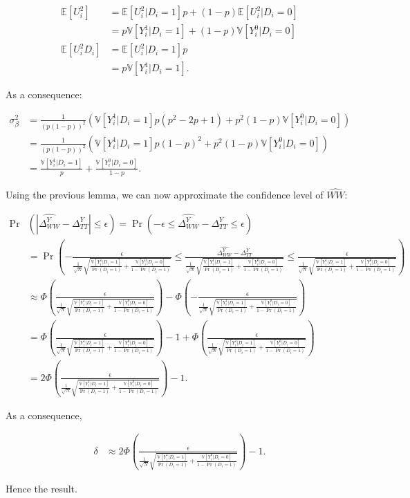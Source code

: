 \documentclass[]{book}
\newcommand{\esp}[1]{\mathbb{E}[ #1 ]}
\newcommand{\var}[1]{\mathbb{V}[ #1 ]}
\theoremstyle{definition}
\theoremstyle{definition}
\theoremstyle{definition}
\theoremstyle{remark}
\begin{document}
\begin{align*}
\esp{U_i^2} & = \esp{U_i^2|D_i=1}p + (1-p)\esp{U_i^2|D_i=0}\\
            & = p\var{Y_i^1|D_i=1}+(1-p)\var{Y_i^0|D_i=0} \\
\esp{U_i^2D_i}  & = \esp{U_i^2|D_i=1}p  \\
                & = p\var{Y_i^1|D_i=1}.
 \end{align*}

As a consequence:

\begin{align*}
\sigma^2_{\beta} &= \frac{1}{(p(1-p))^2}\left(\var{Y_i^1|D_i=1}p(p^2-2p+1) + p^2(1-p)\var{Y_i^0|D_i=0}\right) \\
                  &= \frac{1}{(p(1-p))^2}\left(\var{Y_i^1|D_i=1}p(1-p)^2 + p^2(1-p)\var{Y_i^0|D_i=0}\right)\\
                  & = \frac{\var{Y_i^1|D_i=1}}{p}+\frac{\var{Y_i^0|D_i=0}}{1-p}.
 \end{align*}

Using the previous lemma, we can now approximate the confidence level of \(\hat{WW}\):

\begin{align*}
\Pr&(|\hat{\Delta^Y_{WW}}-\Delta^Y_{TT}|\leq\epsilon) = \Pr(-\epsilon\leq\hat{\Delta^Y_{WW}}-\Delta^Y_{TT}\leq\epsilon) \\
& = \Pr\left(-\frac{\epsilon}{\frac{1}{\sqrt{N}}\sqrt{\frac{\var{Y_i^1|D_i=1}}{\Pr(D_i=1)}+\frac{\var{Y_i^0|D_i=0}}{1-\Pr(D_i=1)}}}\leq\frac{\hat{\Delta^Y_{WW}}-\Delta^Y_{TT}}{\frac{1}{\sqrt{N}}\sqrt{\frac{\var{Y_i^1|D_i=1}}{\Pr(D_i=1)}+\frac{\var{Y_i^0|D_i=0}}{1-\Pr(D_i=1)}}}\leq\frac{\epsilon}{\frac{1}{\sqrt{N}}\sqrt{\frac{\var{Y_i^1|D_i=1}}{\Pr(D_i=1)}+\frac{\var{Y_i^0|D_i=0}}{1-\Pr(D_i=1)}}}\right)\\
& \approx \Phi\left(\frac{\epsilon}{\frac{1}{\sqrt{N}}\sqrt{\frac{\var{Y_i^1|D_i=1}}{\Pr(D_i=1)}+\frac{\var{Y_i^0|D_i=0}}{1-\Pr(D_i=1)}}}\right)-
\Phi\left(-\frac{\epsilon}{\frac{1}{\sqrt{N}}\sqrt{\frac{\var{Y_i^1|D_i=1}}{\Pr(D_i=1)}+\frac{\var{Y_i^0|D_i=0}}{1-\Pr(D_i=1)}}}\right)\\
& = \Phi\left(\frac{\epsilon}{\frac{1}{\sqrt{N}}\sqrt{\frac{\var{Y_i^1|D_i=1}}{\Pr(D_i=1)}+\frac{\var{Y_i^0|D_i=0}}{1-\Pr(D_i=1)}}}\right)- 1 + \Phi\left(\frac{\epsilon}{\frac{1}{\sqrt{N}}\sqrt{\frac{\var{Y_i^1|D_i=1}}{\Pr(D_i=1)}+\frac{\var{Y_i^0|D_i=0}}{1-\Pr(D_i=1)}}}\right)\\
& = 2\Phi\left(\frac{\epsilon}{\frac{1}{\sqrt{N}}\sqrt{\frac{\var{Y_i^1|D_i=1}}{\Pr(D_i=1)}+\frac{\var{Y_i^0|D_i=0}}{1-\Pr(D_i=1)}}}\right)-1.
\end{align*}

As a consequence,

\begin{align*}
\delta & \approx 2\Phi\left(\frac{\epsilon}{\frac{1}{\sqrt{N}}\sqrt{\frac{\var{Y_i^1|D_i=1}}{\Pr(D_i=1)}+\frac{\var{Y_i^0|D_i=0}}{1-\Pr(D_i=1)}}}\right)-1.
\end{align*}

Hence the result.
\end{document}
